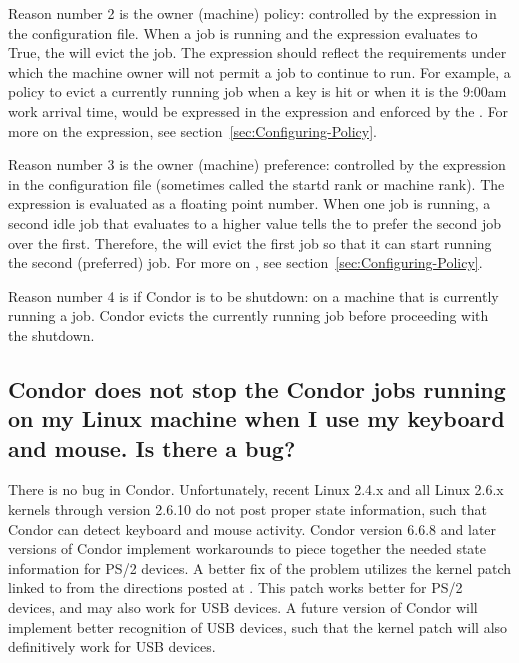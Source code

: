 Reason number 2 is the owner (machine) policy:
controlled by the  expression in the configuration file.
When a job is running and the  expression
evaluates to True,
the  will evict the job.
The  expression should reflect 
the requirements under which the machine owner will not permit
a job to continue to run.
For example, a policy to evict a currently running job when a key is hit
or when it is the 9:00am work arrival time,
would be expressed in the  expression 
and enforced by the .
For more on the  expression,
see section~\ref{sec:Configuring-Policy}.

Reason number 3 is the owner (machine) preference:
controlled by the  expression in the 
configuration file (sometimes called the startd rank or machine rank).
The  expression is evaluated as a floating point number.
When one job is running, a second idle job that evaluates to a higher
 value 
tells the  to prefer the second job over the first.
Therefore, the  will evict the first 
job so that it can start running the second (preferred) job.
For more on ,
see section~\ref{sec:Configuring-Policy}.

Reason number 4 is if Condor is to be shutdown:
on a machine that is currently running a job.
Condor evicts the currently running job before proceeding
with the shutdown.

\subsection*{Condor does not stop the Condor jobs running on my Linux machine
when I use my keyboard and mouse.  Is there a bug?}

There is no bug in Condor.
Unfortunately,
recent Linux 2.4.x and all Linux 2.6.x kernels through 
version 2.6.10
do not post proper state information,
such that Condor can detect keyboard and mouse activity.
Condor version 6.6.8 and later versions of Condor
implement workarounds to piece together the needed
state information for PS/2 devices.
A better fix of the problem utilizes the 
kernel patch linked to from the directions posted at
.
This patch works better for PS/2 devices, and
may also work for USB devices.
A future version of Condor will implement better recognition
of USB devices,
such that the kernel patch will also definitively work for USB devices.



